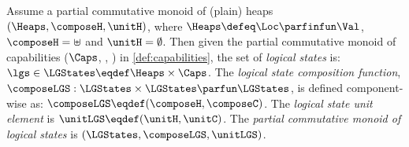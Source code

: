 \begin{definition}\label{def:logical_states}
Assume a partial commutative monoid of (plain) heaps \( (\Heaps, \composeH, \unitH) \), where \(\Heaps \defeq \Loc \parfinfun \Val \), \( \composeH = \uplus \) and \( \unitH = \emptyset \).
Then given the partial commutative monoid of capabilities ($\Caps$, \composeC, \unitC) in \ref{def:capabilities}, the set of \emph{logical states} is: \(\lgs \in \LGStates \eqdef \Heaps \times \Caps\).
The \emph{logical state composition function}, $\composeLGS: \LGStates \times \LGStates \parfun \LGStates$, is defined component-wise as: $\composeLGS \eqdef (\composeH, \composeC)$.
The \emph{logical state unit element} is $\unitLGS \eqdef (\unitH, \unitC)$.
The \emph{partial commutative monoid of logical states} is $(\LGStates, \composeLGS, \unitLGS)$.
%
\end{definition}
